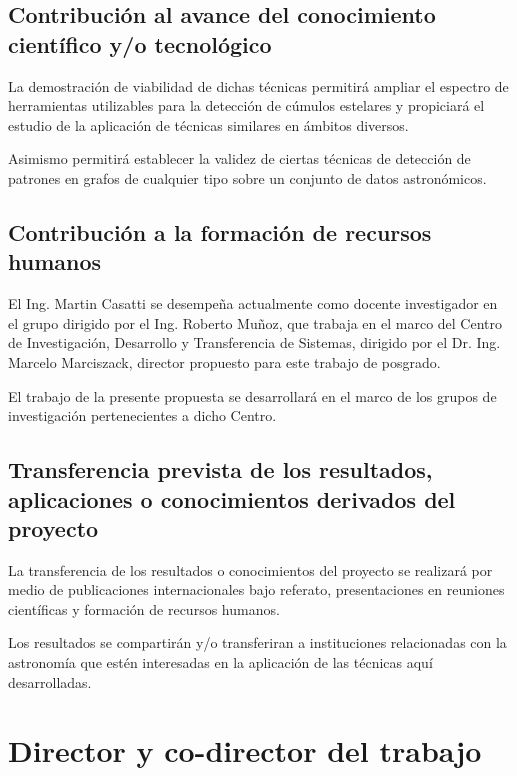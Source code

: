\documentclass[
	11pt,oneside,a4paper,
	headsepline,footsepline,
	fleqn,
]{memoir}
\begin{document}
\subsection{Contribución al avance del conocimiento científico y/o tecnológico}


La demostración de viabilidad de dichas técnicas permitirá ampliar el espectro de herramientas utilizables para la detección de cúmulos estelares y propiciará el estudio de la aplicación de técnicas similares en ámbitos diversos.

Asimismo permitirá establecer la validez de ciertas técnicas de detección de patrones en grafos de cualquier tipo sobre un conjunto de datos astronómicos.

\subsection{Contribución a la formación de recursos humanos}

El Ing. Martin Casatti se desempeña actualmente como docente investigador en el grupo dirigido por el Ing. Roberto Muñoz, que trabaja en el marco del Centro de Investigación, Desarrollo y Transferencia de Sistemas, dirigido por el Dr. Ing. Marcelo Marciszack, director propuesto para este trabajo de posgrado.

El trabajo de la presente propuesta se desarrollará en el marco de los grupos de investigación pertenecientes a dicho Centro.

\subsection{Transferencia prevista de los resultados, aplicaciones o conocimientos derivados del proyecto}

La transferencia de los resultados o conocimientos del proyecto se realizará por medio de publicaciones internacionales bajo referato, presentaciones en reuniones científicas y formación de recursos humanos.

Los resultados se compartirán y/o transferiran a instituciones relacionadas con la astronomía que estén interesadas en la aplicación de las técnicas aquí desarrolladas.

\section{Director y co-director del trabajo}
\end{document}

